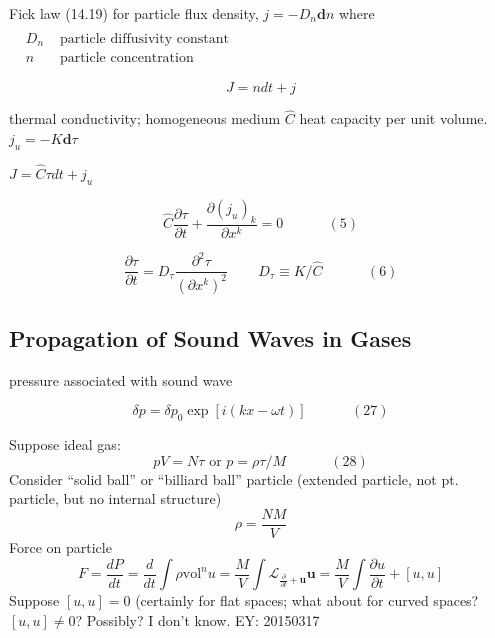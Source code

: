 \documentclass[twoside]{amsart}
\theoremstyle{plain}
\theoremstyle{definition}
\begin{document}
Fick law (14.19) for particle flux density, $j = -D_n \mathbf{d}n$ where $\begin{aligned}  & \quad \\ 
  & D_n  & \text{ particle diffusivity constant } \\ 
  & n   & \text{ particle concentration } \end{aligned}$ 

\[
J = n dt + j
\]

thermal conductivity; homogeneous medium
$\widehat{C}$ heat capacity per unit volume.  $j_u = -K \mathbf{d}\tau$

$J = \widehat{C} \tau dt + j_u$

\begin{equation}
\widehat{C} \frac{ \partial \tau}{ \partial t} + \frac{ \partial (j_u)_k}{ \partial x^k} = 0 \quad \quad \quad \, (5)
\end{equation}

\begin{equation}
  \frac{ \partial \tau}{ \partial t} = D_{\tau} \frac{ \partial^2 \tau}{ ( \partial x^k)^2 } \quad \quad \, D_{\tau} \equiv K/\widehat{C} \quad \quad \quad \, (6) 
\end{equation}

\subsection*{Propagation of Sound Waves in Gases}

pressure associated with sound wave 

\begin{equation}
  \delta p = \delta p_0 \exp{ [ i (kx - \omega t) ] } \quad \quad \quad \, (27) 
\end{equation}

Suppose ideal gas: 
\begin{equation}
  pV = N \tau \text{ or } p = \rho \tau /M \quad \quad \quad \, (28)
\end{equation}
Consider ``solid ball'' or ``billiard ball'' particle (extended particle, not pt. particle, but no internal structure)
\[
\rho = \frac{NM}{V}
\]
Force on particle 
\[
F = \frac{dP}{dt} = \frac{d}{dt} \int \rho \text{vol}^n u = \frac{M}{V} \int \mathcal{L}_{ \frac{ \partial }{ \partial t} + \mathbf{u} }\mathbf{u} = \frac{M}{V} \int \frac{ \partial u}{ \partial t} + [u,u]
\]
Suppose $[u,u]=0$ (certainly for flat spaces; what about for curved spaces? $[u,u] \neq 0$? Possibly? I don't know. EY: 20150317
\end{document}
